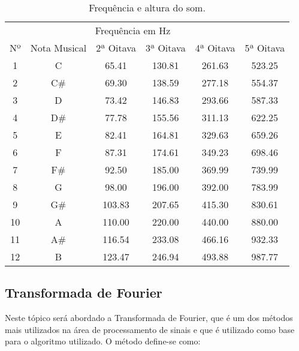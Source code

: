 \documentclass{sbrt}
\begin{document}
\begin{table}[ht]
  \centering
  \caption{\label{tab:freq} Frequência e altura do som.}
  \vspace{-0.2cm}
  \begin{tabular}{c c c c c c}
       & \multicolumn{4}{c}{Frequência em Hz}                                                 \\
    Nº & Nota Musical                         & 2ª Oitava & 3ª Oitava & 4ª Oitava & 5ª Oitava \\
    \hline
    1  & C                                    & 65.41     & 130.81    & 261.63    & 523.25    \\
    2  & C\#                                  & 69.30     & 138.59    & 277.18    & 554.37    \\
    3  & D                                    & 73.42     & 146.83    & 293.66    & 587.33    \\
    4  & D\#                                  & 77.78     & 155.56    & 311.13    & 622.25    \\
    5  & E                                    & 82.41     & 164.81    & 329.63    & 659.26    \\
    6  & F                                    & 87.31     & 174.61    & 349.23    & 698.46    \\
    7  & F\#                                  & 92.50     & 185.00    & 369.99    & 739.99    \\
    8  & G                                    & 98.00     & 196.00    & 392.00    & 783.99    \\
    9  & G\#                                  & 103.83    & 207.65    & 415.30    & 830.61    \\
    10 & A                                    & 110.00    & 220.00    & 440.00    & 880.00    \\
    11 & A\#                                  & 116.54    & 233.08    & 466.16    & 932.33    \\
    12 & B                                    & 123.47    & 246.94    & 493.88    & 987.77    \\
  \end{tabular}
\end{table}

\subsection{Transformada de Fourier}

Neste tópico será abordado a Transformada de Fourier, que é um dos métodos mais utilizados na área de processamento de sinais e que é utilizado como base para o algoritmo utilizado. O método define-se como:
\end{document}
